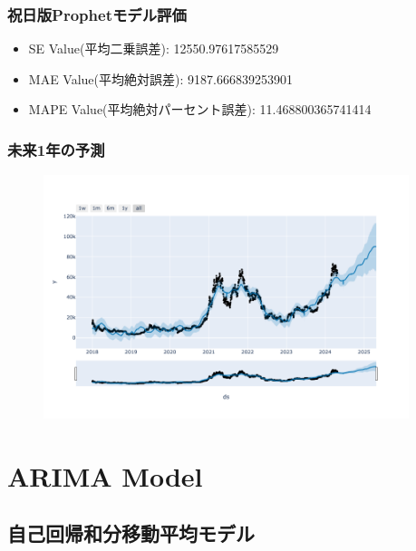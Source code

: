 \documentclass{beamer}  %
\begin{document}
\begin{frame}
    \frametitle{祝日版Prophetモデル評価}
    \begin{itemize}
        \item SE Value(平均二乗誤差): 12550.97617585529
        \item MAE Value(平均絶対誤差): 9187.666839253901
        \item MAPE Value(平均絶対パーセント誤差): 11.468800365741414
    \end{itemize}
\end{frame}

\begin{frame}
    \frametitle{未来1年の予測}
    \begin{figure}[h]
        \begin{center}
            \includegraphics[keepaspectratio, width=0.95\textwidth]{pic/prophet_all.png}
        \end{center}
    \end{figure}
\end{frame}

\section{ARIMA Model}

\subsection{自己回帰和分移動平均モデル}
\end{document}
